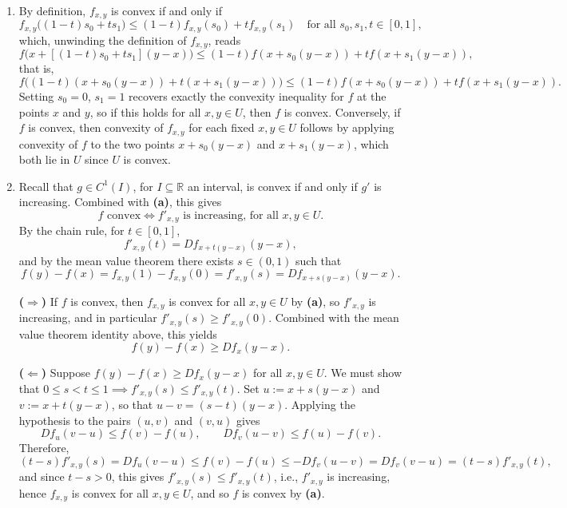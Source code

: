 \begin{exercisesolution}
\begin{enumerate}[label=\textbf{(\alph*)}]
  \item By definition, $f_{x,y}$ is convex if and only if
    \[f_{x,y}\big((1-t)s_0+ts_1\big) \leq (1-t)f_{x,y}(s_0)+tf_{x,y}(s_1) \quad \text{for all } s_0,s_1,t \in [0,1],\]
    which, unwinding the definition of $f_{x,y}$, reads
    \[f\big(x+[(1-t)s_0+ts_1](y-x)\big) \leq (1-t)f(x+s_0(y-x))+tf(x+s_1(y-x)),\]
    that is,
    \[f\big((1-t)(x+s_0(y-x))+t(x+s_1(y-x))\big) \leq (1-t)f(x+s_0(y-x))+tf(x+s_1(y-x)).\]
    Setting $s_0=0$, $s_1=1$ recovers exactly the convexity inequality for $f$ at the points $x$
    and $y$, so if this holds for all $x,y \in U$, then $f$ is convex. Conversely, if $f$ is
    convex, then convexity of $f_{x,y}$ for each fixed $x,y \in U$ follows by applying convexity
    of $f$ to the two points $x+s_0(y-x)$ and $x+s_1(y-x)$, which both lie in $U$ since $U$ is
    convex.
  \item Recall that $g \in C^1(I)$, for $I \subseteq \mathbb{R}$ an interval, is convex if and
    only if $g'$ is increasing. Combined with \textbf{(a)}, this gives
    \[f \text{ convex} \iff f'_{x,y} \text{ is increasing, for all } x,y \in U.\]
    By the chain rule, for $t \in [0,1]$,
    \[f'_{x,y}(t) = Df_{x+t(y-x)}(y-x),\]
    and by the mean value theorem there exists $s \in (0,1)$ such that
    \[f(y)-f(x) = f_{x,y}(1)-f_{x,y}(0) = f'_{x,y}(s) = Df_{x+s(y-x)}(y-x).\]

    \textbf{($\Rightarrow$)} If $f$ is convex, then $f_{x,y}$ is convex for all $x,y \in U$ by
    \textbf{(a)}, so $f'_{x,y}$ is increasing, and in particular $f'_{x,y}(s) \geq f'_{x,y}(0)$.
    Combined with the mean value theorem identity above, this yields
    \[f(y)-f(x) \geq Df_x(y-x).\]

    \textbf{($\Leftarrow$)} Suppose $f(y)-f(x) \geq Df_x(y-x)$ for all $x,y \in U$. We must show
    that $0 \leq s < t \leq 1 \implies f'_{x,y}(s) \leq f'_{x,y}(t)$. Set $u := x+s(y-x)$ and
    $v := x+t(y-x)$, so that $u-v = (s-t)(y-x)$. Applying the hypothesis to the pairs $(u,v)$ and
    $(v,u)$ gives
    \[Df_u(v-u) \leq f(v)-f(u), \qquad Df_v(u-v) \leq f(u)-f(v).\]
    Therefore,
    \[(t-s)f'_{x,y}(s) = Df_u(v-u) \leq f(v)-f(u) \leq -Df_v(u-v) = Df_v(v-u) = (t-s)f'_{x,y}(t),\]
    and since $t-s>0$, this gives $f'_{x,y}(s) \leq f'_{x,y}(t)$, i.e., $f'_{x,y}$ is increasing,
    hence $f_{x,y}$ is convex for all $x,y \in U$, and so $f$ is convex by \textbf{(a)}.


\end{enumerate}
\end{exercisesolution}
